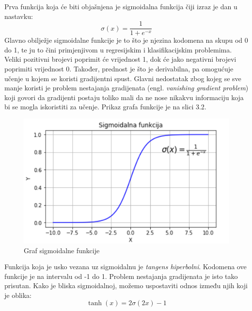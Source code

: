 \documentclass[times, utf8, zavrsni, numeric]{fer}
\begin{document}
Prva funkcija koja će biti objašnjena je sigmoidalna funkcija čiji izraz je dan u nastavku:
\begin{equation}
\sigma(x)=\frac{1}{1 + e^{-x}}
\label{eq:Aktivacija}
\end{equation}
Glavno obilježje sigmoidalne funkcije je to što je njezina kodomena na skupu od 0 do 1, te ju to čini primjenjivom u regresijskim i klasifikacijskim problemima. Veliki pozitivni brojevi poprimit će vrijednost 1, dok će jako negativni brojevi poprimiti vrijednost 0. Također, prednost je što je derivabilna, pa omogućuje učenje u kojem se koristi gradijentni spust. Glavni nedostatak zbog kojeg se sve manje koristi je problem nestajanja gradijenata (engl. \textit{vanishing gradient problem}) koji govori da gradijenti postaju toliko mali da ne nose nikakvu informaciju koja bi se mogla iskoristiti za učenje. Prikaz grafa funkcije je na slici 3.2.\\
\begin{figure}[htb]
\centering
\includegraphics[scale=0.6]{img/slika6.png}
\caption{Graf sigmoidalne funkcije}
\label{fig:Perceptron}
\end{figure}
\linebreak
Funkcija koja je usko vezana uz sigmoidalnu je \textit{tangens hiperbolni}. Kodomena ove funkcije je na intervalu od -1 do 1. Problem nestajanja gradijenata je isto tako prisutan. Kako je bliska sigmoidalnoj, možemo uspostaviti odnos između njih koji je oblika:
\begin{equation}
\tanh(x) = 2\sigma(2x)-1
\label{eq:Aktivacija}
\end{equation}
\end{document}
